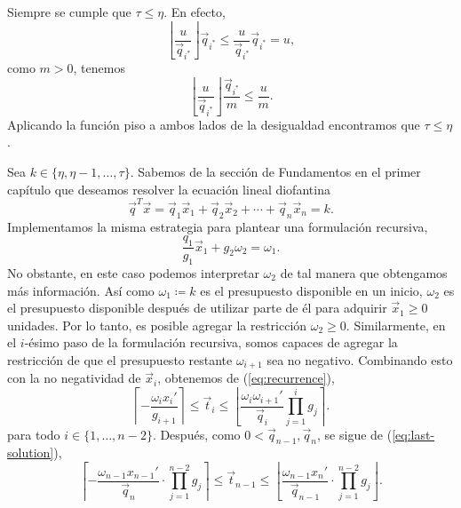 \begin{observation}
	Siempre se cumple que $\tau \leq \eta$. En efecto,
	\begin{equation*}
		\left\lfloor \frac{u}{\vec{q}_{i^*}} \right\rfloor \vec{q}_{i^*}
		\leq \frac{u}{\vec{q}_{i^*}} \vec{q}_{i^*} = u,
	\end{equation*}
	como $m > 0$, tenemos
	\begin{equation*}
		\left\lfloor \frac{u}{\vec{q}_{i^*}} \right\rfloor \frac{\vec{q}_{i^*}}{m}
		\leq \frac{u}{m}.
	\end{equation*}
	Aplicando la función piso a ambos lados de la desigualdad encontramos que $\tau \leq \eta$.
\end{observation}

Sea $k \in \lbrace \eta, \eta - 1, \ldots, \tau \rbrace$. Sabemos de la sección de Fundamentos en el
primer capítulo que deseamos resolver la ecuación lineal diofantina
\begin{equation*}
	\vec{q}^T\vec{x} = \vec{q}_1\vec{x}_1 + \vec{q}_2\vec{x}_2 + \cdots + \vec{q}_n\vec{x}_n = k.
\end{equation*}
Implementamos la misma estrategia para plantear una formulación recursiva,
\begin{equation*}
	\frac{q_1}{g_1}\vec{x}_1 + g_2\omega_2 = \omega_1.
\end{equation*}
No obstante, en este caso podemos interpretar $\omega_2$ de tal manera que obtengamos más
información. Así como $\omega_1 \coloneq k$  es el presupuesto disponible en un inicio, $\omega_2$
es el presupuesto disponible después de utilizar parte de él para adquirir $\vec{x}_1 \geq 0$ unidades.
Por lo tanto, es posible agregar la restricción $\omega_2 \geq 0$. Similarmente, en el $i$-ésimo
paso de la formulación recursiva, somos capaces de agregar la restricción de que el presupuesto
restante $\omega_{i + 1}$ sea no negativo. Combinando esto con la no negatividad de $\vec{x}_i$, obtenemos
de (\ref{eq:recurrence}),
\begin{equation}
	\label{phase-1:finite:eq:param-bounds}
	\left\lceil -\frac{\omega_ix_i'}{g_{i+1}} \right\rceil
	\leq
	\vec{t}_i
	\leq
	\left\lfloor \frac{\omega_i\omega_{i+1}'}{\vec{q}_i} \prod_{j=1}^{i}g_j \right\rceil.
\end{equation}
para todo $i \in \lbrace 1, \ldots, n - 2\rbrace$. Después, como $0 < \vec{q}_{n - 1}, \vec{q}_n$, se sigue de
(\ref{eq:last-solution}),
\begin{equation}
	\label{phase-1:finite:eq:param-bounds-last}
	\left\lceil -\frac{\omega_{n-1}x_{n-1}'}{\vec{q}_n} \cdot \prod_{j=1}^{n-2}g_j \right\rceil
	\leq
	\vec{t}_{n - 1}
	\leq
	\left\lfloor \frac{\omega_{n-1}x_{n}'}{\vec{q}_{n-1}} \cdot \prod_{j=1}^{n-2}g_j \right\rfloor.
\end{equation}

